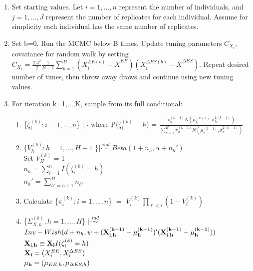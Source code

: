 \documentclass[11pt]{article}\usepackage[]{graphicx}\usepackage[]{color}
\begin{document}
\begin{enumerate}
\item
Set starting values. Let $i=1,...,n$ represent the number of individuals, and $j=1,...,J$ represent the number of replicates for each individual. Assume for simplicity each individual has the same number of replicates.

\item
Set b=0. Run the MCMC below B times. Update tuning parameters $C_{X_i}$, covariance for random walk by setting $C_{X_i} = \frac{2.4^2}{2} \frac{1}{B-1} \sum_{b=1}^{B} (X_i^{EE(b)}-\bar{X}^{EE})(X_i^{\Delta ES(b)}-\bar{X}^{\Delta ES})$. Repeat desired number of times, then throw away draws and continue using new tuning values. 

\item
For iteration k=1,...,K, sample from its full conditional:

\begin{enumerate}
\item
  \{$\zeta_i^{(k)}:i=1,...,n$\} $|$ $\cdot$  
 where P($\zeta_i^{(k)}=h$) = $\frac{\pi_h^{(k-1)} N(\mu_h^{(k-1)},\sigma_h^{2(k-1)})}{\sum_{h=1}^{H}\pi_h^{(k-1)} N(\mu_h^{(k-1)},\sigma_h^{2(k-1)})}$ \\

\item
 \{$V_h^{(k)}:h=1,...,H-1$ \}$|\cdot \overset{ind}{\sim}$  $Beta(1+n_h,\alpha+n_h')$ \\
Set $V_H^{(k)}$ = 1 \\
$n_h = \sum_{i=1}^{n} I(\zeta_i^{(k)}=h)$\\
$n_h' = \sum_{h'=h+1}^{H} n_{h'}$\\


\item
Calculate \{$\pi_i^{(k)}:i=1,...,n$\} $=$ $V_i^{(k)} \prod_{\ell < i} (1-V_{\ell}^{(k)})$




\item
 \{$\Sigma_{X,h}^{(k)}, h=1,...,H$\} $|\cdot \overset{ind}{\sim}$ $Inv-Wish(d+n_h,\psi+({\bf X_{i,h}^{(k-1)} - \mu_h^{(k-1)}})'({\bf X_{i,h}^{(k-1)} - \mu_h^{(k-1)}}))$ \\

${\bf X_{i,h}} \equiv  {\bf X_i} I(\zeta_i^{(k)}=h)$ \\
${\bf X_i} = (X_i^{EE},X_i^{\Delta ES})$ \\
${\bf \mu_h} = (\mu_{EE,h},\mu_{\Delta ES,h})$




\end{enumerate}
\end{enumerate}
\end{document}

